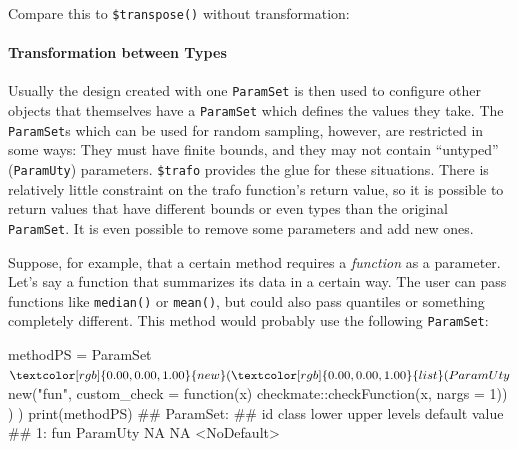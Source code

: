 \documentclass[]{article}
\newenvironment{Shaded}{}{}
\newcommand{\ControlFlowTok}[1]{\textcolor[rgb]{0.00,0.00,1.00}{#1}}
\newcommand{\DataTypeTok}[1]{#1}
\newcommand{\DecValTok}[1]{#1}
\newcommand{\KeywordTok}[1]{\textcolor[rgb]{0.00,0.00,1.00}{#1}}
\newcommand{\NormalTok}[1]{#1}
\newcommand{\OperatorTok}[1]{#1}
\newcommand{\OtherTok}[1]{\textcolor[rgb]{1.00,0.25,0.00}{#1}}
\newcommand{\StringTok}[1]{\textcolor[rgb]{0.00,0.50,0.50}{#1}}
\let\oldparagraph\paragraph
\renewcommand{\paragraph}[1]{\oldparagraph{#1}\mbox{}}
\renewenvironment{Shaded} {\begin{snugshade}\small} {\end{snugshade}}
\begin{document}
Compare this to \texttt{\$transpose()} without transformation:

\begin{Shaded}
\end{Shaded}

\hypertarget{transformation-between-types}{%
\paragraph{Transformation between Types}\label{transformation-between-types}}

Usually the design created with one \texttt{ParamSet} is then used to configure other objects that themselves have a \texttt{ParamSet} which defines the values they take.
The \texttt{ParamSet}s which can be used for random sampling, however, are restricted in some ways:
They must have finite bounds, and they may not contain ``untyped'' (\texttt{ParamUty}) parameters.
\texttt{\$trafo} provides the glue for these situations.
There is relatively little constraint on the trafo function's return value, so it is possible to return values that have different bounds or even types than the original \texttt{ParamSet}.
It is even possible to remove some parameters and add new ones.

Suppose, for example, that a certain method requires a \emph{function} as a parameter.
Let's say a function that summarizes its data in a certain way.
The user can pass functions like \texttt{median()} or \texttt{mean()}, but could also pass quantiles or something completely different.
This method would probably use the following \texttt{ParamSet}:

\begin{Shaded}
\begin{Highlighting}[]
\NormalTok{methodPS =}\StringTok{ }\NormalTok{ParamSet}\OperatorTok{$}\KeywordTok{new}\NormalTok{(}
  \KeywordTok{list}\NormalTok{(}
\NormalTok{    ParamUty}\OperatorTok{$}\KeywordTok{new}\NormalTok{(}\StringTok{"fun"}\NormalTok{,}
      \DataTypeTok{custom_check =} \ControlFlowTok{function}\NormalTok{(x) checkmate}\OperatorTok{::}\KeywordTok{checkFunction}\NormalTok{(x, }\DataTypeTok{nargs =} \DecValTok{1}\NormalTok{))}
\NormalTok{  )}
\NormalTok{)}
\KeywordTok{print}\NormalTok{(methodPS)}
\NormalTok{## ParamSet: }
\NormalTok{##     id    class lower upper levels     default value}
\NormalTok{## 1: fun ParamUty    NA    NA        <NoDefault>}
\end{Highlighting}
\end{Shaded}
\end{document}
